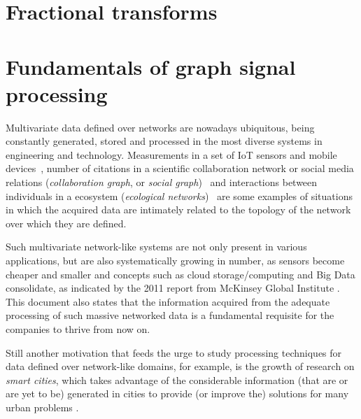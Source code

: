 \section{Fractional transforms}

\section{Fundamentals of graph signal processing}

Multivariate data defined over networks are nowadays ubiquitous, being constantly generated, stored and processed in the most diverse systems in engineering and technology. Measurements in a set of IoT sensors and mobile devices~\cite{alam2015toward,guo2016qos,ma2016non,yu2016novel}, number of citations in a scientific collaboration network or social media relations (\emph{collaboration graph}, or \emph{social graph})~\cite{chung2010graph} and interactions between individuals in a ecosystem (\emph{ecological networks})~\cite{golubski2016} are some examples of situations in which the acquired data are intimately related to the topology of the network over which they are defined.

Such multivariate network-like systems are not only present in various applications, but are also systematically growing in number, as sensors become cheaper and smaller and concepts such as cloud storage/computing and Big Data consolidate, as indicated by the 2011 report from McKinsey Global Institute \cite{mckinsey2011big}. This document also states that the information acquired from the adequate processing of such massive networked data is a fundamental requisite for the companies to thrive from now on.

Still another motivation that feeds the urge to study processing techniques for data defined over network-like domains, for example, is the growth of research on \emph{smart cities}, which takes advantage of the considerable information (that are or are yet to be) generated in cities to provide (or improve the) solutions  for many urban problems \cite{jain2014big}.

